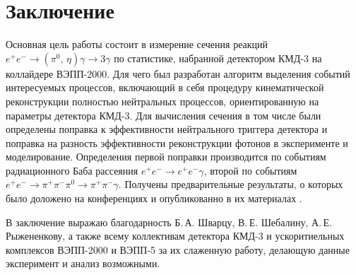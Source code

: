 \section{Заключение}

Основная цель работы состоит в измерение сечения реакций
$e^+ e^- \to ( \pi^0 , \, \eta ) \gamma \to 3 \gamma$ по статистике,
набранной детектором КМД-3 на коллайдере ВЭПП-2000.
Для чего был разработан алгоритм выделения событий интересуемых процессов,
включающий в себя процедуру кинематической реконструкции полностью нейтральных процессов,
ориентированную на параметры детектора КМД-3.
Для вычисления сечения в том числе были определены поправка к эффективности нейтрального триггера детектора
и поправка на разность эффективности реконструкции фотонов в эксперименте и моделирование.
Определения первой поправки производится по событиям радиационного Баба рассеяния
$e^+ e^- \to e^+ e^- \gamma$,
второй по событиям $e^+ e^- \to \pi^+ \pi^- \pi^0 \to \pi^+ \pi^- \gamma$.
Получены предварительные результаты,
о которых было доложено на конференциях и опубликованно в их материалах \cite{Ivanov:2018cxt, Akhmetshin:2018mqd}.

В заключение выражаю благодарность Б.\,А. Шварцу, В.\,Е. Шебалину, А.\,Е. Рыжененкову,
а также всему коллективам детектора КМД-3 и ускоритиельных комплексов ВЭПП-2000 и ВЭПП-5 за их слаженную работу,
делающую данные эксперимент и анализ возможными.